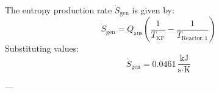 The entropy production rate \( \dot{S}_{\text{gen}} \) is given by:  
\[
\dot{S}_{\text{gen}} = Q_{\text{aus}} \left( \frac{1}{T_{\text{KF}}} - \frac{1}{T_{\text{Reactor},1}} \right)
\]  
Substituting values:  
\[
\dot{S}_{\text{gen}} = 0.0461 \, \frac{\text{kJ}}{\text{s·K}}
\]  

---